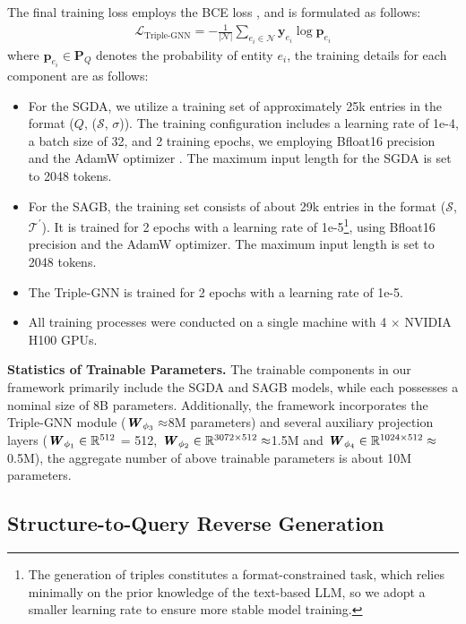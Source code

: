 \documentclass[11pt]{article}
\begin{document}
The final training loss employs the BCE loss \cite{luo2025gfmrag_arxiv}, and is formulated as follows:
\begin{align}
\mathcal{L}_\text{Triple-GNN} = -\frac{1}{|\mathcal{N}|}\sum_{e_i \in \mathcal{N}}\boldsymbol{y}_{e_i}\log{\boldsymbol{p}_{e_i}}
\end{align}
where $\boldsymbol{p}_{e_i} \in \boldsymbol{P}_Q$ denotes the probability of entity $e_i$, the training details for each component are as follows: 
\begin{itemize}
\item For the SGDA, we utilize a training set of approximately 25k entries in the format ($Q$, ($\mathcal{S}$, $\sigma$)). The training configuration includes a learning rate of 1e-4, a batch size of 32, and 2 training epochs, we employing Bfloat16 \cite{kalamkar2019study} precision and the AdamW optimizer \cite{loshchilov2019decoupled}. The maximum input length for the SGDA is set to 2048 tokens. 
\item For the SAGB, the training set consists of about 29k entries in the format ($\mathcal{S}$, $\mathcal{T}^{'}$). It is trained for 2 epochs with a learning rate of 1e-5\footnote{The generation of triples constitutes a format-constrained task, which relies minimally on the prior knowledge of the text-based LLM, so we adopt a smaller learning rate to ensure more stable model training.}, using Bfloat16 precision and the AdamW optimizer. The maximum input length is set to 2048 tokens. 
\item The Triple-GNN is trained for 2 epochs with a learning rate of 1e-5.
\item All training processes were conducted on a single machine with 4 $\times$ NVIDIA H100 GPUs.
\end{itemize}

\textbf{Statistics of Trainable Parameters.} The trainable components in our framework primarily include the SGDA and SAGB models, while each possesses a nominal size of 8B parameters. Additionally, the framework incorporates the Triple-GNN module ($\textbf{\textit{W}}_{\phi_3}\approx$8M parameters) and several auxiliary projection layers ($\textbf{\textit{W}}_{\phi_1}\in \mathbb{R}^{512}$ = 512, $\textbf{\textit{W}}_{\phi_2} \in \mathbb{R}^{3072\times512}\approx$1.5M and $\textbf{\textit{W}}_{\phi_4} \in \mathbb{R}^{1024\times512}\approx$0.5M), the aggregate number of above trainable parameters is about 10M parameters.

\subsection{Structure-to-Query Reverse Generation}
\label{sec:reverse_gen}
\end{document}
